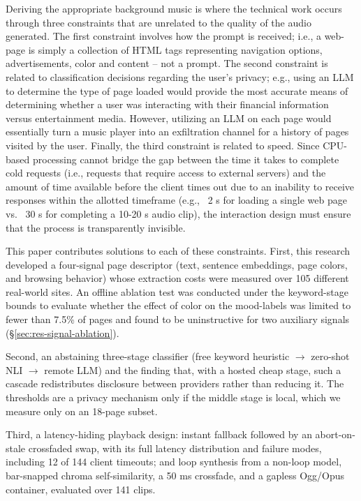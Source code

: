 \documentclass[conference]{IEEEtran}
\begin{document}
Deriving the appropriate background music is where the technical work occurs
through three constraints that are unrelated to the quality of the audio
generated. The first constraint involves how the prompt is received; i.e., a
web-page is simply a collection of HTML tags representing navigation options,
advertisements, color and content -- not a prompt. The second constraint is
related to classification decisions regarding the user's privacy; e.g., using
an LLM to determine the type of page loaded would provide the most accurate
means of determining whether a user was interacting with their financial
information versus entertainment media. However, utilizing an LLM on each page
would essentially turn a music player into an exfiltration channel for a
history of pages visited by the user. Finally, the third constraint is related
to speed. Since CPU-based processing cannot bridge the gap between the time it
takes to complete cold requests (i.e., requests that require access to
external servers) and the amount of time available before the client times out
due to an inability to receive responses within the allotted timeframe (e.g.,
~2 s for loading a single web page vs. ~30 s for completing a 10-20 s audio
clip), the interaction design must ensure that the process is transparently
invisible.

This paper contributes solutions to each of these constraints. First, this
research developed a four-signal page descriptor (text, sentence embeddings,
page colors, and browsing behavior) whose extraction costs were measured over
105 different real-world sites. An offline ablation test was conducted under
the keyword-stage bounds to evaluate whether the effect of color on the
mood-labels was limited to fewer than 7.5\% of pages and found to be
uninstructive for two auxiliary signals (\S\ref{sec:res-signal-ablation}).

Second, an abstaining three-stage classifier (free keyword heuristic $\to$
zero-shot NLI $\to$ remote LLM) and the finding that, with a hosted cheap
stage, such a cascade redistributes disclosure between providers rather than
reducing it. The thresholds are a privacy mechanism only if the middle stage
is local, which we measure only on an 18-page subset.

Third, a latency-hiding playback design: instant fallback followed by an
abort-on-stale crossfaded swap, with its full latency distribution and failure
modes, including 12 of 144 client timeouts; and loop synthesis from a non-loop
model, bar-snapped chroma self-similarity, a 50 ms crossfade, and a gapless
Ogg/Opus container, evaluated over 141 clips.
\end{document}
